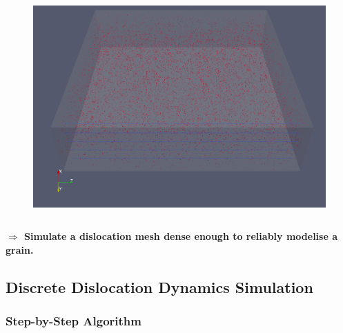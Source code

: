 \documentclass[aspectratio=1610,t,10pt]{beamer}
\newlength{\freeheight}
\begin{document}
\begin{frame}
\begin{columns}[c]
\begin{column}{.44\textwidth}
\begin{figure}
    		\includegraphics[height=0.5\freeheight]{img/basalglide_big}
    	\end{figure}        
    \end{column}
    \end{columns}
    \vfill
    \centering
    
    \textbf{$\Rightarrow$ Simulate a dislocation mesh dense enough to reliably modelise a grain.}
\end{frame}


\subsection{Discrete Dislocation Dynamics Simulation}

\subsubsection{Step-by-Step Algorithm}
\end{document}
